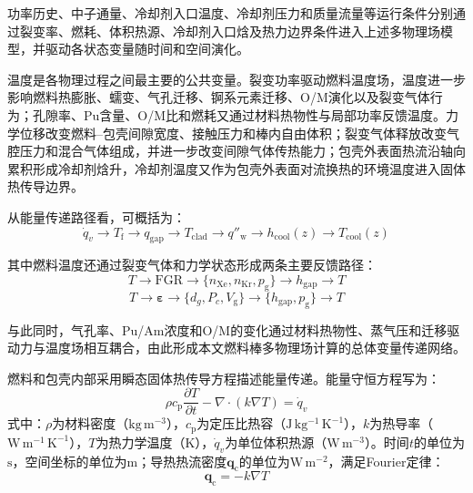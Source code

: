 功率历史、中子通量、冷却剂入口温度、冷却剂压力和质量流量等运行条件分别通过裂变率、燃耗、体积热源、冷却剂入口{\rarecharfont 焓}及热力边界条件进入上述多物理场模型，并驱动各状态变量随时间和空间演化。

温度是各物理过程之间最主要的公共变量。裂变功率驱动燃料温度场，温度进一步影响燃料热膨胀、蠕变、气孔迁移、锕系元素迁移、O/M演化以及裂变气体行为；孔隙率、Pu含量、O/M比和燃耗又通过材料热物性与局部功率反馈温度。力学位移改变燃料--包壳间隙宽度、接触压力和棒内自由体积；裂变气体释放改变气腔压力和混合气体组成，并进一步改变间隙气体传热能力；包壳外表面热流沿轴向累积形成冷却剂{\rarecharfont 焓}升，冷却剂温度又作为包壳外表面对流换热的环境温度进入固体热传导边界。

从能量传递路径看，可概括为：
\begin{equation}
	\dot q_v
	\rightarrow T_{\mathrm f}
	\rightarrow q_{\mathrm{gap}}
	\rightarrow T_{\mathrm{clad}}
	\rightarrow q''_{\mathrm w}
	\rightarrow h_{\mathrm{cool}}(z)
	\rightarrow T_{\mathrm{cool}}(z)
	\label{eq:ch2_energy_chain}
\end{equation}

其中燃料温度还通过裂变气体和力学状态形成两条主要反馈路径：
\begin{equation}
	T
	\rightarrow \mathrm{FGR}
	\rightarrow \{n_{\mathrm{Xe}},n_{\mathrm{Kr}},p_{\mathrm g}\}
	\rightarrow h_{\mathrm{gap}}
	\rightarrow T
	\label{eq:ch2_fgr_feedback_overall}
\end{equation}
\begin{equation}
	T
	\rightarrow \boldsymbol{\varepsilon}
	\rightarrow \{d_g,P_c,V_{\mathrm g}\}
	\rightarrow \{h_{\mathrm{gap}},p_{\mathrm g}\}
	\rightarrow T
	\label{eq:ch2_mechanics_feedback_overall}
\end{equation}

与此同时，气孔率、Pu/Am浓度和O/M的变化通过材料热物性、蒸气压和迁移驱动力与温度场相互耦合，由此形成本文燃料棒多物理场计算的总体变量传递网络。

\label{sec:ch2_heat_coolant}

\label{subsec:ch2_solid_heat}

燃料和包壳内部采用瞬态固体热传导方程描述能量传递。能量守恒方程写为\cite{halesBISONTheoryManual2016,newmanThreeDimensionalCoupled2009}：
\begin{equation}
	\rho c_{\mathrm p}\frac{\partial T}{\partial t}
	-\nabla\cdot\left(k\nabla T\right)
	=\dot q_v
	\label{eq:ch2_heat_equation}
\end{equation}
\noindent 式中：$\rho$为材料密度（$\mathrm{kg\,m^{-3}}$），$c_{\mathrm p}$为定压比热容（$\mathrm{J\,kg^{-1}\,K^{-1}}$），$k$为热导率（$\mathrm{W\,m^{-1}\,K^{-1}}$），$T$为热力学温度（$\mathrm{K}$），$\dot q_v$为单位体积热源（$\mathrm{W\,m^{-3}}$）。时间$t$的单位为$\mathrm{s}$，空间坐标的单位为$\mathrm{m}$；导热热流密度$\boldsymbol q_{\mathrm c}$的单位为$\mathrm{W\,m^{-2}}$，满足Fourier定律：
\begin{equation}
	\mathbf q_{\mathrm c}=-k\nabla T
	\label{eq:ch2_fourier_law}
\end{equation}

